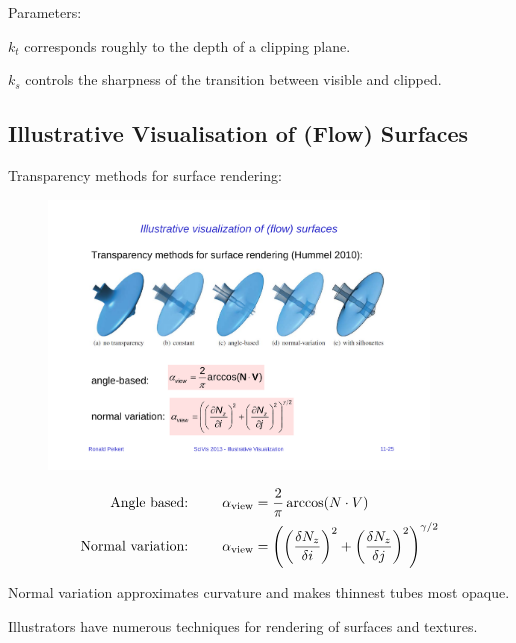 Parameters:
\begin{description}
\item $k_t$ corresponds roughly to the depth of a clipping plane.
\item $k_s$ controls the sharpness of the transition between visible and clipped.
\end{description}

\subsection{Illustrative Visualisation of (Flow) Surfaces}
Transparency methods for surface rendering:
\begin{figure}[H]
\centering
\includegraphics[width=0.9\textwidth,page=1]{img/11_transparency_methods}
\end{figure}

\begin{align*}
 \text{Angle based: }\qquad \alpha_\text{view} &= {2\over \pi} \arccos(N\cdot V)\\
 \text{Normal variation: }\qquad \alpha_\text{view} &= \left(
     \left( {\delta N_z \over \delta i}\right)^2
     +
     \left( {\delta N_z \over \delta j}\right)^2
 \right)^{\gamma/2}
\end{align*}

Normal variation approximates curvature and makes thinnest tubes most opaque.

Illustrators have numerous techniques for rendering of surfaces and textures. 




































